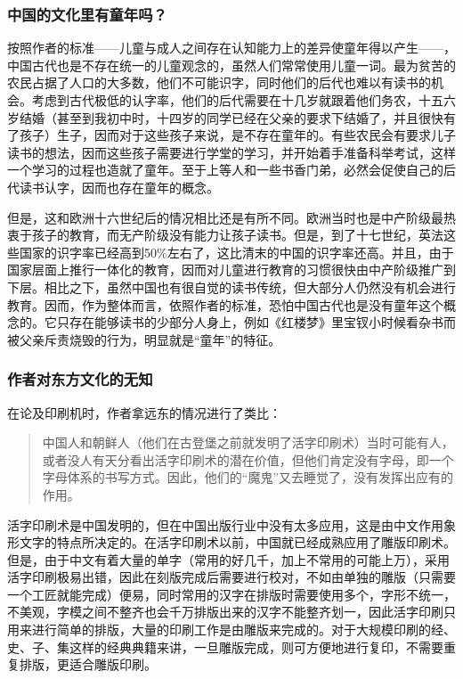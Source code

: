 \subsubsection{中国的文化里有童年吗？}
按照作者的标准——儿童与成人之间存在认知能力上的差异使童年得以产生——，中国古代也是不存在统一的儿童观念的，虽然人们常常使用儿童一词。最为贫苦的农民占据了人口的大多数，他们不可能识字，同时他们的后代也难以有读书的机会。考虑到古代极低的认字率，他们的后代需要在十几岁就跟着他们务农，十五六岁结婚（甚至到我初中时，十四岁的同学已经在父亲的要求下结婚了，并且很快有了孩子）生子，因而对于这些孩子来说，是不存在童年的。有些农民会有要求儿子读书的想法，因而这些孩子需要进行学堂的学习，并开始着手准备科举考试，这样一个学习的过程也造就了童年。至于上等人和一些书香门弟，必然会促使自己的后代读书认字，因而也存在童年的概念。

但是，这和欧洲十六世纪后的情况相比还是有所不同。欧洲当时也是中产阶级最热衷于孩子的教育，而无产阶级没有能力让孩子读书。但是，到了十七世纪，英法这些国家的识字率已经高到50\%左右了，这比清末的中国的识字率还高。并且，由于国家层面上推行一体化的教育，因而对儿童进行教育的习惯很快由中产阶级推广到下层。相比之下，虽然中国也有很自觉的读书传统，但大部分人仍然没有机会进行教育。因而，作为整体而言，依照作者的标准，恐怕中国古代也是没有童年这个概念的。它只存在能够读书的少部分人身上，例如《红楼梦》里宝钗小时候看杂书而被父亲斥责烧毁的行为，明显就是“童年”的特征。


\subsubsection{作者对东方文化的无知}
在论及印刷机时，作者拿远东的情况进行了类比：
\begin{quotation}
中国人和朝鲜人（他们在古登堡之前就发明了活字印刷术）当时可能有人，或者没人有天分看出活字印刷术的潜在价值，但他们肯定没有字母，即一个字母体系的书写方式。因此，他们的“魔鬼”又去睡觉了，没有发挥出应有的作用。
\end{quotation}

活字印刷术是中国发明的，但在中国出版行业中没有太多应用，这是由中文作用象形文字的特点所决定的。在活字印刷术以前，中国就已经成熟应用了雕版印刷术。但是，由于中文有着大量的单字（常用的好几千，加上不常用的可能上万），采用活字印刷极易出错，因此在刻版完成后需要进行校对，不如由单独的雕版（只需要一个工匠就能完成）便易，同时常用的汉字在排版时需要使用多个，字形不统一，不美观，字模之间不整齐也会千万排版出来的汉字不能整齐划一，因此活字印刷只用来进行简单的排版，大量的印刷工作是由雕版来完成的。对于大规模印刷的经、史、子、集这样的经典典籍来讲，一旦雕版完成，则可方便地进行复印，不需要重复排版，更适合雕版印刷。

